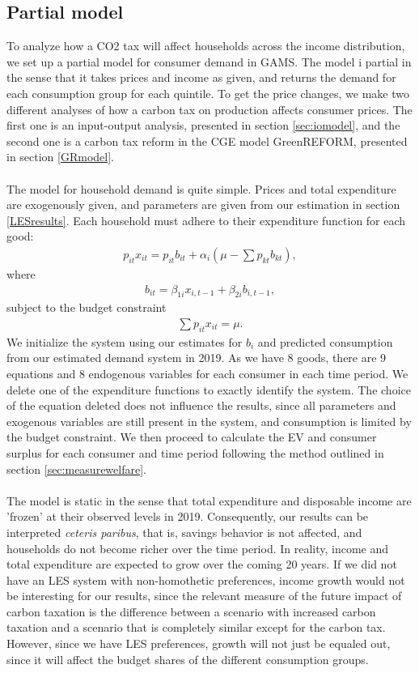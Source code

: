 \subsection{Partial model}
To analyze how a CO2 tax will affect households across the income distribution, we set up a partial model for consumer demand in GAMS. The model i partial in the sense that it takes prices and income as given, and returns the demand for each consumption group for each quintile. To get the price changes, we make two different analyses of how a carbon tax on production affects consumer prices. The first one is an input-output analysis, presented in section \ref{sec:iomodel}, and the second one is a carbon tax reform in the CGE model GreenREFORM, presented in section \ref{GRmodel}.  
\\
\\
The model for household demand is quite simple. Prices and total expenditure are exogenously given, and parameters are given from our estimation in section \ref{LESresults}. Each household must adhere to their expenditure function for each good: 
\begin{align}
    p_{it} x_{it} = p_{it} b_{it} + \alpha_i(\mu - \sum p_{kt} b_{kt}),
\end{align}
where
\begin{align}
    b_{it} = \beta_{1i} x_{i,t-1} + \beta_{2i} b_{i,t-1},
\end{align}
subject to the budget constraint
\begin{align}
    \sum p_{it} x_{it} = \mu.
\end{align}
We initialize the system using our estimates for $b_i$ and predicted consumption from our estimated demand system in 2019. As we have 8 goods, there are 9 equations and 8 endogenous variables for each consumer in each time period. We delete one of the expenditure functions to exactly identify the system. The choice of the equation deleted does not influence the results, since all parameters and exogenous variables are still present in the system, and consumption is limited by the budget constraint. We then proceed to calculate the EV and consumer surplus for each consumer and time period following the method outlined in section \ref{sec:measurewelfare}. 
\\
\\
The model is static in the sense that total expenditure and disposable income are 'frozen' at their observed levels in 2019. Consequently, our results can be interpreted \textit{ceteris paribus}, that is, savings behavior is not affected, and households do not become richer over the time period. In reality, income and total expenditure are expected to grow over the coming 20 years. If we did not have an LES system with non-homothetic preferences, income growth would not be interesting for our results, since the relevant measure of the future impact of carbon taxation is the difference between a scenario with increased carbon taxation and a scenario that is completely similar except for the carbon tax. However, since we have LES preferences, growth will not just be equaled out, since it will affect the budget shares of the different consumption groups. 

